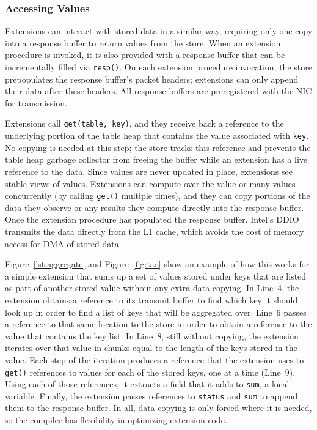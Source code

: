 \subsubsection{Accessing Values}
\label{sec:access}

Extensions can interact with stored data in a similar way, requiring only one
  copy into a response buffer to return values from the store.
When an extension procedure is invoked, it is also provided with a response
  buffer that can be incrementally filled via \texttt{resp()}.
On each extension procedure invocation, the store prepopulates the response
  buffer's packet headers; extensions can only append their data after these
  headers.
All response buffers are preregistered with the NIC for transmission.

Extensions call \texttt{get(table, key)}, and they receive back a reference to
  the underlying portion of the table heap that contains the value associated
  with \texttt{key}.
No copying is needed at this step; the store tracks this reference and prevents the table
  heap garbage collector from freeing the buffer while an extension has a live
  reference to the data.
Since values are never updated in place, extensions see stable views of values.
Extensions can compute over the value or many values concurrently (by calling \texttt{get()} multiple times), and they can
  copy portions of the data they observe or any results they compute directly into
  the response buffer.
Once the extension procedure has populated the response buffer, Intel's
  DDIO~\cite{ddio} transmits the data directly from the L1 cache, which avoids
  the cost of memory access for DMA of stored data.

Figure~\ref{lst:aggregate} and Figure~\ref{fig:tao} show an example of how
  this works for a simple extension that sums up a set of values stored under
  keys that are listed as part of another stored value without any extra data copying.
In Line~4, the extension obtains a reference to its transmit buffer to find
  which key it should look up in order to find a list of keys that will be aggregated over.
Line~6 passes a reference to that same location to the store in order to
  obtain a reference to the value that contains the key list.
In Line~8, still without copying, the extension iterates over that value in
  chunks equal to the length of the keys stored in the value.
Each step of the iteration produces a reference that the extension uses
to \texttt{get()}
  references to values for each of the stored keys, one at a time (Line~9).
Using each of those references, it extracts a field that it adds to
  \texttt{sum}, a local variable.
Finally, the extension passes references to \texttt{status} and \texttt{sum} to append
  them to the response buffer.
In all, data copying is only forced where it is needed, so the compiler has
  flexibility in optimizing extension code.

